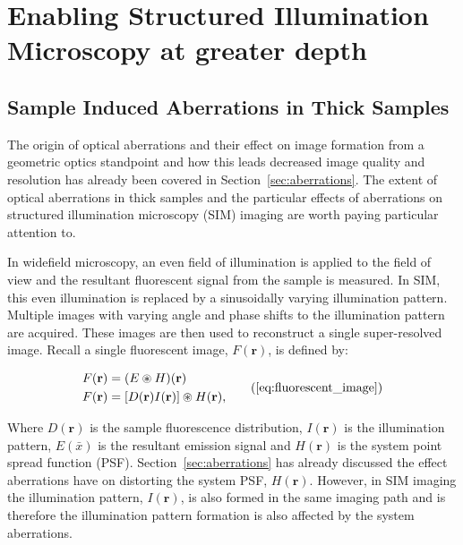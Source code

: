\chapter{Enabling Structured Illumination Microscopy at greater depth}

\section{Sample Induced Aberrations in Thick Samples}
\label{sec:sample_aberrations_thick}

The origin of optical aberrations and their effect on image
formation from a geometric optics standpoint and how this leads 
decreased image quality and resolution has already been covered 
in Section~\ref{sec:aberrations}. The extent of optical 
aberrations in thick samples and the particular effects of
aberrations on structured illumination microscopy (SIM) imaging 
are worth paying particular attention to. 

In widefield microscopy, an even field of illumination is 
applied to the field of view and the resultant fluorescent
signal from the sample is measured. In SIM, this even 
illumination is replaced by a sinusoidally varying
illumination pattern. Multiple images with varying angle 
and phase shifts to the illumination pattern are acquired. 
These images are then used to reconstruct a single 
super-resolved image.\cite{gustafsson2000surpassing,gustafsson2008three}
Recall a single fluorescent image, $F(\textbf{r})$, is 
defined by:

\begin{equation}
\begin{split}
F(\textbf{r}) &= (E \circledast H)(\textbf{r})\\
F(\textbf{r}) &= [D(\textbf{r})I(\textbf{r})] \circledast H(\textbf{r}),\\
\end{split}\tag{\ref{eq:fluorescent_image}}
\end{equation}

Where $D(\textbf{r})$ is the sample fluorescence distribution, 
$I(\textbf{r})$ is the illumination pattern, $E(\bar{x})$ is
the resultant emission signal and $H(\textbf{r})$ is the system 
point spread function (PSF). Section~\ref{sec:aberrations} has already
discussed the effect aberrations have on distorting the system
PSF, $H(\textbf{r})$. However, in SIM imaging the illumination 
pattern, $I(\textbf{r})$, is also formed in the same imaging path
and is therefore the illumination pattern formation is also 
affected by the system aberrations.

